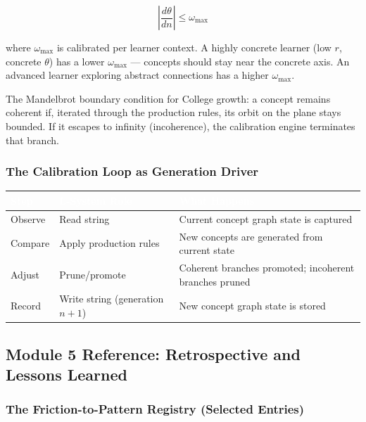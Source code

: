 \documentclass[11pt,letterpaper]{article}
\newcommand{\tableheader}[1]{\textbf{\sffamily\textcolor{white}{#1}}}
\begin{document}
\[
  \left|\frac{d\theta}{dn}\right| \leq \omega_\text{max}
\]

where $\omega_\text{max}$ is calibrated per learner context. A highly concrete learner (low $r$,
concrete $\theta$) has a lower $\omega_\text{max}$ --- concepts should stay near the concrete axis.
An advanced learner exploring abstract connections has a higher $\omega_\text{max}$.

The Mandelbrot boundary condition for College growth: a concept remains coherent if, iterated
through the production rules, its orbit on the plane stays bounded. If it escapes to infinity
(incoherence), the calibration engine terminates that branch.

\subsubsection{The Calibration Loop as Generation Driver}

\begin{center}
\begin{tabularx}{\textwidth}{L{2.5cm}L{2cm}X}
\toprule
{}
\tableheader{Step} & \tableheader{L-System Role} & \tableheader{What Happens} \\
\midrule
Observe & Read string & Current concept graph state is captured \\
Compare & Apply production rules & New concepts are generated from current state \\
Adjust & Prune/promote & Coherent branches promoted; incoherent branches pruned \\
Record & Write string (generation $n+1$) & New concept graph state is stored \\
\bottomrule
\end{tabularx}
\end{center}

\subsection{Module 5 Reference: Retrospective and Lessons Learned}

\subsubsection{The Friction-to-Pattern Registry (Selected Entries)}
\end{document}
